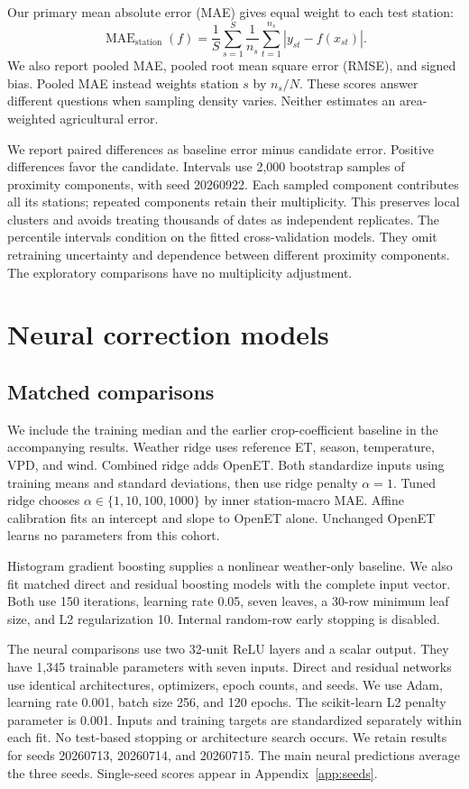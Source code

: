\documentclass[10pt,letterpaper]{article}
\begin{document}
Our primary mean absolute error (MAE) gives equal weight to each test station:
\begin{equation}
\operatorname{MAE}_{\mathrm{station}}(f)=
\frac{1}{S}\sum_{s=1}^{S}\frac{1}{n_s}\sum_{t=1}^{n_s}|y_{st}-f(x_{st})|.
\label{eq:macro}
\end{equation}
We also report pooled MAE, pooled root mean square error (RMSE), and signed bias.
Pooled MAE instead weights station $s$ by $n_s/N$.
These scores answer different questions when sampling density varies.
Neither estimates an area-weighted agricultural error.

We report paired differences as baseline error minus candidate error.
Positive differences favor the candidate.
Intervals use 2,000 bootstrap samples of proximity components, with seed 20260922.
Each sampled component contributes all its stations; repeated components retain their multiplicity.
This preserves local clusters and avoids treating thousands of dates as independent replicates.
The percentile intervals condition on the fitted cross-validation models.
They omit retraining uncertainty and dependence between different proximity components.
The exploratory comparisons have no multiplicity adjustment.

\section{Neural correction models}\label{sec:models}
\subsection{Matched comparisons}
We include the training median and the earlier crop-coefficient baseline in the accompanying results.
Weather ridge uses reference ET, season, temperature, VPD, and wind.
Combined ridge adds OpenET.
Both standardize inputs using training means and standard deviations, then use ridge penalty $\alpha=1$.
Tuned ridge chooses $\alpha\in\{1,10,100,1000\}$ by inner station-macro MAE.
Affine calibration fits an intercept and slope to OpenET alone.
Unchanged OpenET learns no parameters from this cohort.

Histogram gradient boosting supplies a nonlinear weather-only baseline.
We also fit matched direct and residual boosting models with the complete input vector.
Both use 150 iterations, learning rate 0.05, seven leaves, a 30-row minimum leaf size, and L2 regularization 10.
Internal random-row early stopping is disabled.

The neural comparisons use two 32-unit ReLU layers and a scalar output.
They have 1,345 trainable parameters with seven inputs.
Direct and residual networks use identical architectures, optimizers, epoch counts, and seeds.
We use Adam, learning rate 0.001, batch size 256, and 120 epochs.
The scikit-learn L2 penalty parameter is 0.001.
Inputs and training targets are standardized separately within each fit.
No test-based stopping or architecture search occurs.
We retain results for seeds 20260713, 20260714, and 20260715.
The main neural predictions average the three seeds.
Single-seed scores appear in Appendix~\ref{app:seeds}.
\end{document}
